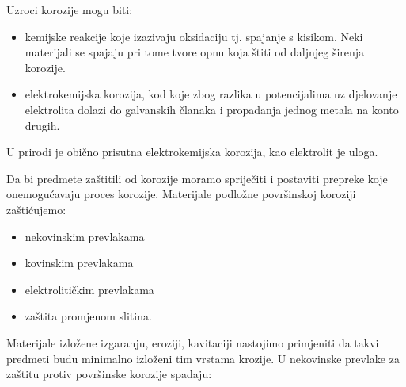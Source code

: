 \documentclass[a4paper,12pt]{article}
\numberwithin{figure}{section}
\begin{document}
Uzroci korozije mogu biti:
\begin{itemize}
\item kemijske reakcije koje izazivaju oksidaciju tj. spajanje s kisikom. Neki materijali se spajaju pri tome tvore opnu koja štiti od daljnjeg širenja korozije. 
\item elektrokemijska korozija, kod koje zbog razlika u potencijalima uz djelovanje elektrolita dolazi do galvanskih članaka i propadanja jednog metala na konto drugih.
\end{itemize}
U prirodi je obično prisutna elektrokemijska korozija, kao elektrolit je uloga. \par
Da bi predmete zaštitili od korozije moramo spriječiti i postaviti prepreke koje onemogućavaju proces korozije. Materijale podložne površinskoj koroziji zaštićujemo:
\begin{itemize}
\item nekovinskim prevlakama
\item kovinskim prevlakama
\item elektrolitičkim prevlakama
\item zaštita promjenom slitina.
\end{itemize} 
Materijale izložene izgaranju, eroziji, kavitaciji nastojimo primjeniti da takvi predmeti budu minimalno izloženi tim vrstama krozije. U nekovinske prevlake za zaštitu protiv površinske korozije spadaju:
\end{document}
